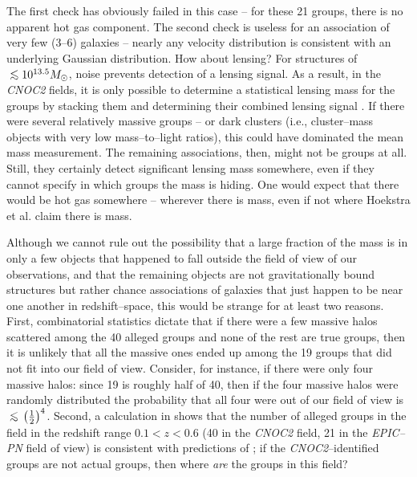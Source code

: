 \documentclass[12pt,preprint]{aastex}
\def\lsim{\;\rlap{\lower 2.5pt
   \hbox{$\sim$}}\raise 1.5pt\hbox{$<$}\;}
\begin{document}
The first check has obviously failed in this case -- for these
21 groups, there is no apparent hot gas component.  The second check is
useless for an association of very few (3--6) galaxies -- nearly any velocity
distribution is consistent with an underlying Gaussian distribution.  How about
lensing?  For structures of $\lsim 10^{13.5} M_\sun$, noise prevents
detection of a lensing signal.
As a result, in the \textsl{CNOC2} fields, it is only possible to determine a
statistical lensing mass for the groups by stacking them and determining their
combined lensing signal \citep{hoekstra_et_al2001, hoekstra_et_al2003CNOC2}.
If there were several relatively massive groups -- or dark clusters 
(i.e., cluster--mass objects with very low mass--to--light ratios),
this could have dominated the mean mass measurement.  The
remaining associations, then, might not be groups at all.  Still,
they certainly detect significant lensing mass somewhere, even if they cannot
specify in which groups the mass is hiding.  One would expect that
there would be hot gas somewhere -- wherever there is mass, even if not where
Hoekstra et al. claim there is mass.

Although we cannot rule out the possibility that a large fraction of the mass
is in only a few objects that happened to fall outside the field of view of our
observations, and that the remaining objects are not gravitationally bound
structures but rather chance associations of galaxies that just happen to be
near one another in redshift--space, 
this would be strange for at least two reasons.
First, combinatorial statistics dictate that if there were a few
massive halos scattered among the 40 alleged groups and none of the rest are
true groups, then it is unlikely that all the massive ones ended up
among the 19 groups that did not fit into our field of view.  
Consider, for instance, if there were only four massive halos:
since 19 is roughly half of 40, then if the four massive halos were randomly
distributed the probability that all four were out of our field of view is
$\lsim\left(\frac{1}{2}\right)^4$.
Second, a calculation in \citet{carlberg2001gg} shows that the number of alleged
groups in the field in the redshift range $0.1<z<0.6$
(40 in the \textsl{CNOC2} field, 21 in the \textsl{EPIC--PN} field of view)
is consistent with predictions of \citet{press+schecter1974}; if the
\textsl{CNOC2}--identified groups are not actual groups, then where
{\it are} the groups in this field?
\end{document}
